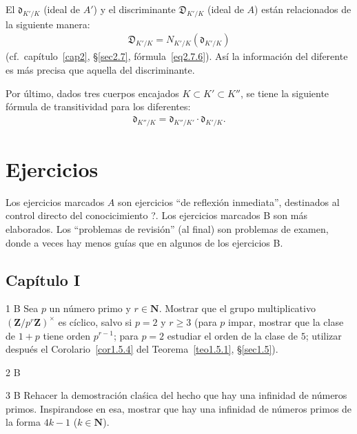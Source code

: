 \documentclass[bibtotoc,leqno,spanish]{amsbook}
\newcommand{\ZZ}{\mathbf{Z}}
\newcommand{\NN}{\mathbf{N}}
\newcommand{\disc}{\mathfrak{D}}
\newcommand{\diff}{\mathfrak{d}}
\numberwithin{equation}{section}
\theoremstyle{note}
\newcommand{\exername}{}
\newtheorem*{namedexer}{\exername}
\newenvironment{exer*}[1]{\renewcommand{\exername}{#1}\begin{namedexer}}{\end{namedexer}}
\theoremstyle{note}
\theoremstyle{rem}
\numberwithin{theorem}{section}
\numberwithin{proposition}{section}
\numberwithin{definition}{section}
\numberwithin{lemma}{section}
\numberwithin{corollary}{section}
\numberwithin{example}{section}
\numberwithin{footnote}{section}%
\begin{document}
El  $\diff_{K'/K}$ (ideal de $A'$) y el discriminante $\disc_{K'/K}$ (ideal de $A$) est\'an relacionados
de la siguiente manera:
\begin{gather}
\disc_{K'/K}=N_{K'/K}(\diff_{K'/K})
\end{gather}
(cf.~cap\'itulo~\ref{cap2}, \S\ref{sec2.7}, f\'ormula~\eqref{eq2.7.6}). As\'i la informaci\'on del diferente es m\'as
precisa que aquella del discriminante.

Por \'ultimo, dados tres cuerpos encajados $K\subset K'\subset K''$, se tiene la siguiente f\'ormula de transitividad
para los diferentes:
\begin{gather}
\diff_{K''/K} = \diff_{K''/K'}\cdot\diff_{K'/K}.
\end{gather}

\chapter*{Ejercicios}

Los ejercicios marcados $A$ son ejercicios ``de reflexi\'on inmediata'', destinados al
control directo del conocicimiento ?. Los ejercicios marcados B son m\'as elaborados. Los
``problemas de revisi\'on'' (al final) son problemas de examen, donde a veces hay menos gu\'ias
que en algunos de los ejercicios B.

\section*{Cap\'itulo I}

\begin{exer*}{1 B}
Sea $p$ un n\'umero primo y $r\in\NN$. Mostrar que el grupo multiplicativo
$(\ZZ/p^r\ZZ)^\times$ es c\'iclico, salvo si $p=2$ y $r\geq 3$ (para $p$ impar,
mostrar que la clase de $1+p$ tiene orden $p^{r-1}$; para $p=2$ estudiar el orden
de la clase de $5$; utilizar despu\'es el Corolario~\ref{cor1.5.4} del Teorema~\ref{teo1.5.1},
\S\ref{sec1.5}).
\end{exer*}

\begin{exer*}{2 B}
\end{exer*}

\begin{exer*}{3 B}
Rehacer la demostraci\'on cla\'sica del hecho que hay una infinidad de n\'umeros primos. Inspirandose
en esa, mostrar que hay una infinidad de n\'umeros primos de la forma $4k-1$ ($k\in\NN$).
\end{exer*}
\end{document}
